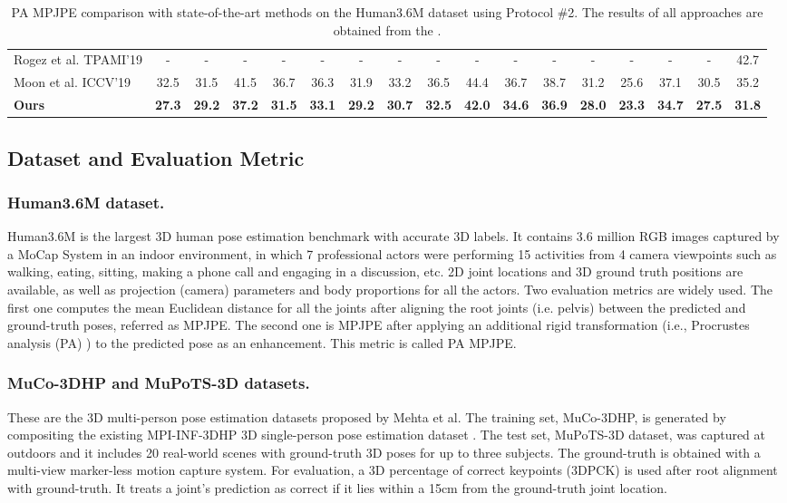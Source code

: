 \documentclass[letterpaper]{article} \usepackage{aaai21}  \usepackage{times}  \usepackage{helvet} \usepackage{courier}  \usepackage[hyphens]{url}  \usepackage{graphicx} \urlstyle{rm} \def\UrlFont{\rm}  \usepackage{natbib}  \usepackage{caption} \frenchspacing  \setlength{\pdfpagewidth}{8.5in}  \setlength{\pdfpageheight}{11in}
\begin{document}
\begin{table*}[ht]
{{\begin{tabular}{l|cccccccccccccccc}
  Rogez et al. TPAMI'19& - & - & - & - & - & - & - & - & - & - & - & - & - & - & - & 42.7 \\
  Moon et al. ICCV'19& 32.5 & 31.5 & 41.5 & 36.7 & 36.3 & 31.9 & 33.2 & 36.5 & 44.4 & 36.7 & 38.7 & 31.2 & 25.6 & 37.1 & 30.5 & 35.2 \\
  \midrule
  \textbf{Ours} & \textbf{27.3} & \textbf{29.2} & \textbf{37.2} & \textbf{31.5} & \textbf{33.1} & \textbf{29.2} & \textbf{30.7} & \textbf{32.5} & \textbf{42.0} & \textbf{34.6} & \textbf{36.9} & \textbf{28.0} & \textbf{23.3} & \textbf{34.7} & \textbf{27.5} & \textbf{31.8} \\
    \bottomrule
    \end{tabular}}}\caption{PA MPJPE comparison with state-of-the-art methods on the Human3.6M dataset using Protocol \#2. The results of all approaches are obtained from the \cite{moon2019camera}.}
  \label{tab:second}\end{table*}


\subsection{Dataset and Evaluation Metric}
\subsubsection{Human3.6M dataset.}
Human3.6M \cite{ionescu2013human3} is the largest 3D human pose estimation benchmark with accurate 3D labels. It contains 3.6 million RGB images captured by a MoCap System in an indoor environment, in which 7 professional actors were performing 15 activities from 4 camera viewpoints such as walking, eating, sitting, making a phone call and engaging in a discussion, etc. 2D joint locations and 3D ground truth positions are available, as well as projection (camera) parameters and body proportions for all the actors. Two evaluation metrics are widely used. The first one computes the mean Euclidean distance for all the joints after aligning the root joints (i.e. pelvis) between the predicted and ground-truth poses, referred as MPJPE. The second one is MPJPE after applying an additional rigid transformation (i.e., Procrustes analysis (PA) ) to the predicted pose as an enhancement. This metric is called PA MPJPE. 

\subsubsection{MuCo-3DHP and MuPoTS-3D datasets.}
These are the 3D multi-person pose estimation datasets proposed by Mehta et al. The training set, MuCo-3DHP, is generated by compositing the existing MPI-INF-3DHP 3D single-person pose estimation dataset \cite{mehta2017monocular}. The test set, MuPoTS-3D dataset, was captured at outdoors and it includes 20 real-world scenes with ground-truth 3D poses for up to three subjects. The ground-truth is obtained with a multi-view marker-less motion capture system. For evaluation, a 3D percentage of correct keypoints (3DPCK) is used after root alignment with ground-truth. It treats a joint’s prediction as correct if it lies within a 15cm from the ground-truth joint location. 
\end{document}
